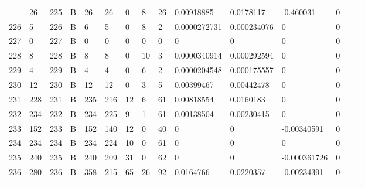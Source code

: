 \begin{longtable}{lllllllllllllll}
\begin{comment}
	225 & 26                & 225 & B   & 26                & 26                & 0                 & 8    & 26         & 0.00918885     & 0.0178117      & -0.460031     & 0            \\
	226 & 5                 & 226 & B   & 6                 & 5                 & 0                 & 8    & 2          & 0.0000272731   & 0.000234076    & 0             & 0            \\
	227 & 0                 & 227 & B   & 0                 & 0                 & 0                 & 0    & 0          & 0              & 0              & 0             & 0            \\
	228 & 8                 & 228 & B   & 8                 & 8                 & 0                 & 10   & 3          & 0.0000340914   & 0.000292594    & 0             & 0            \\
	229 & 4                 & 229 & B   & 4                 & 4                 & 0                 & 6    & 2          & 0.0000204548   & 0.000175557    & 0             & 0            \\
	230 & 12                & 230 & B   & 12                & 12                & 0                 & 3    & 5          & 0.00399467     & 0.00442478     & 0             & 0            \\
	231 & 228               & 231 & B   & 235               & 216               & 12                & 6    & 61         & 0.00818554     & 0.0160183      & 0             & 0            \\
	232 & 234               & 232 & B   & 234               & 225               & 9                 & 1    & 61         & 0.00138504     & 0.00230415     & 0             & 0            \\
	233 & 152               & 233 & B   & 152               & 140               & 12                & 0    & 40         & 0              & 0              & -0.00340591   & 0            \\
	234 & 234               & 234 & B   & 234               & 224               & 10                & 0    & 61         & 0              & 0              & 0             & 0            \\
	235 & 240               & 235 & B   & 240               & 209               & 31                & 0    & 62         & 0              & 0              & -0.000361726  & 0            \\
	236 & 280               & 236 & B   & 358               & 215               & 65                & 26   & 92         & 0.0164766      & 0.0220357      & -0.00234391   & 0            \\

\end{comment}
\end{longtable}
